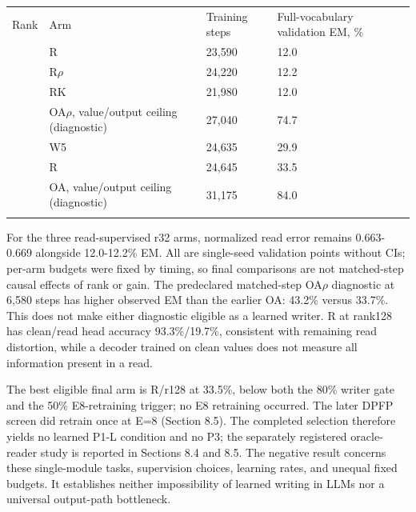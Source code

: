 {\footnotesize
\setlength{\tabcolsep}{3pt}
\begin{longtable}{W{250}{8}W{250}{8}W{250}{8}W{250}{8}}
\toprule
Rank & Arm & Training steps & Full-vocabulary validation EM, \% \\ \addlinespace[3pt]
\midrule {} & R & 23,590 & 12.0 \\  & R\ensuremath{\rho} & 24,220 & 12.2 \\  & RK & 21,980 & 12.0 \\  & OA\ensuremath{\rho}, value/\allowbreak{}output ceiling (diagnostic) & 27,040 & 74.7 \\  & W5 & 24,635 & 29.9 \\  & R & 24,645 & 33.5 \\  & OA, value/\allowbreak{}output ceiling (diagnostic) & 31,175 & 84.0 \\ \addlinespace[3pt]  %
\bottomrule
\end{longtable}
}


For the three read-supervised r32 arms, normalized read error remains
0.663-0.669 alongside 12.0-12.2\% EM.  %
All are single-seed validation points without CIs; per-arm budgets were fixed by
timing, so final comparisons are not matched-step causal effects of rank or gain.
 The predeclared matched-step OA\ensuremath{\rho} diagnostic at 6,580 steps  %
has higher observed EM than the earlier OA: 43.2\% versus 33.7\%. This does not  %
make either diagnostic eligible as a learned writer. R at rank128  %
has clean/\allowbreak{}read head accuracy 93.3\%/\allowbreak{}19.7\%, consistent with remaining read distortion,
while a decoder trained on clean values does not measure all information present
in a read.  %

The best eligible final arm is R/\allowbreak{}r128 at 33.5\%, below both the 80\% writer gate and
the 50\% E8-retraining trigger; no E8 retraining occurred. The later DPFP screen did retrain once at E=8 (Section 8.5). The completed  %
selection therefore yields no learned P1-L condition and no P3; the separately
registered oracle-reader study is reported in Sections 8.4 and 8.5.  %
The negative result concerns these single-module tasks, supervision choices,
learning rates, and unequal fixed budgets. It establishes neither impossibility
of learned writing in LLMs nor a universal output-path bottleneck.  %

